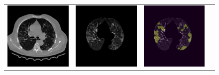 \begin{figure}
\begin{tabular}{c c c c}
    \includegraphics[scale=0.46]{images/Result2-25-ct.jpg} & \!\!
    \includegraphics[scale=0.46]{images/Result2-25-extracted.jpg} & \!\!
    \includegraphics[scale=0.46]{images/Result2-25-unet.jpg} & \!\!

\end{tabular}
\end{figure}
